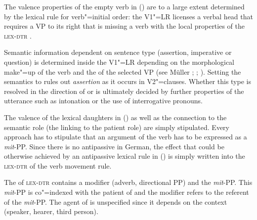 \begin{exe}
\begin{xlist}[iv.]
\begin{exe}
\begin{xlist}[iv.]
{{{{{{{                                                  }\\
                                                 }\\
                                      }\\
                          }\\
}\\
}}
\z
%
The valence properties of the empty verb in () are to a large extent determined by the lexical rule for verb"=initial order: the V1"=LR licenses a verbal head
that requires a VP to its right that is missing a verb with the local properties of the \textsc{lex-dtr} .

Semantic information dependent on sentence type (assertion, imperative or question) is determined inside the V1"=LR depending on the morphological
make"=up of the verb and the \slashv of the selected VP (see Müller
\citeyear[Section~10.3]{MuellerLehrbuch1}; \citeyear{MuellerSatztypen}; \citeyear{MuellerGS}).
Setting the semantics to   rules out \emph{assertion} as it occurs in V2"=clauses.
Whether this type is resolved in the direction of  or
 is ultimately decided by further properties of the utterance such as intonation or the use of interrogative pronouns.

\largerpage[2]
The valence of the lexical daughters in () as well as the connection to the semantic role (the linking to the patient role) are simply stipulated.
Every approach has to stipulate that an argument of the verb has to be expressed as a \emph{mit}-PP. Since there is no antipassive in German,
the effect that could be otherwise achieved by an antipassive lexical rule in () is simply written into the \textsc{lex-dtr} of the verb movement rule.

The \compsl of \textsc{lex-dtr} contains a modifier (adverb, directional PP) and the 
\emph{mit}-PP. This \emph{mit}-PP is co"=indexed with the patient of  and the modifier refers to the referent of the \emph{mit}-PP. The agent
of  is unspecified since it depends on the context (speaker, hearer, third person).


\end{xlist}
\end{exe}
\end{xlist}
\end{exe}
